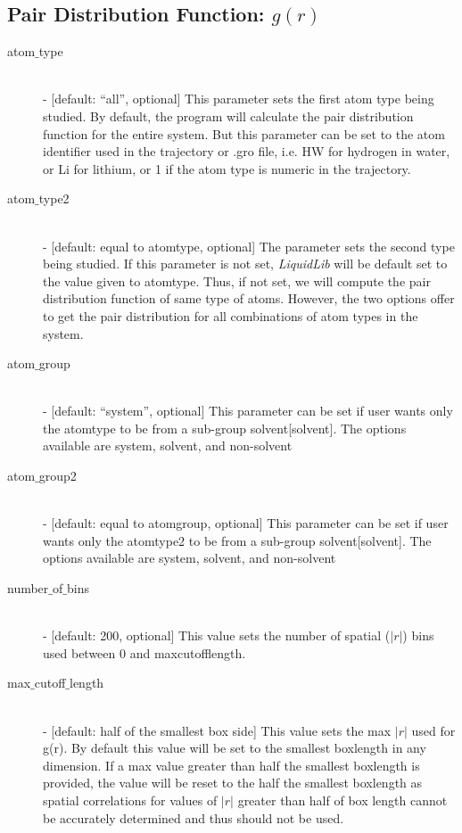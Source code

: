 \documentclass{article}
\begin{document}
\subsection{Pair Distribution Function: $g(r)$} \label{sec::gofr_parm}
\begin{description}	
	\item[atom$\_$type] \hfill \\
	- [default: ``all'', optional] This parameter sets the first atom type being studied.  By default, the program will calculate the pair distribution function for the entire system.  But this parameter can be set to the atom identifier used in the trajectory or .gro file, i.e. HW for hydrogen in water, or Li for lithium, or 1 if the atom type is numeric in the trajectory.
	
	\item[atom$\_$type2] \hfill \\
	- [default: equal to atomtype, optional] The parameter sets the second type being studied.  If this parameter is not set, \textit{LiquidLib} will be default set to the value given to atomtype.  Thus, if not set, we will compute the pair distribution function of same type of atoms. However, the two options offer to get the pair distribution for all combinations of atom types in the system.
	
	\item[atom$\_$group] \hfill \\
	- [default: ``system'', optional] This parameter can be set if user wants only the atomtype to be from a sub-group solvent[solvent].  The options available are system, solvent, and non-solvent
	
	\item[atom$\_$group2] \hfill \\
	- [default: equal to atomgroup, optional] This parameter can be set if user wants only the atomtype2 to be from a sub-group solvent[solvent].  The options available are system, solvent, and non-solvent
		
	\item[number$\_$of$\_$bins] \hfill \\
	- [default: 200, optional] This value sets the number of spatial ($|r|$) bins used between 0 and maxcutofflength.
	
	\item[max$\_$cutoff$\_$length] \hfill \\
	- [default: half of the smallest box side] This value sets the max $|r|$ used for g(r).  By default this value will be set to the smallest boxlength in any dimension.  If a max value greater than half the smallest boxlength is provided, the value will be reset to the half the smallest boxlength as spatial correlations for values of $|r|$ greater than half of box length cannot be accurately determined and thus should not be used.
	
\end{description}
\end{document}
